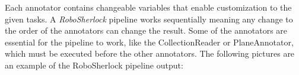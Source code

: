 \documentclass[main.tex]{subfiles}
\begin{document}
Each annotator contains changeable variables that enable customization to the given tasks.
A \textit{RoboSherlock} pipeline works sequentially meaning any change to the order of the annotators can change the result. Some of the annotators are essential for the pipeline to work, like the CollectionReader or PlaneAnnotator, which must be executed before the other annotators. 
The following pictures are an example of the RoboSherlock pipeline output:  \\

\begin{figure}[H]
     \begin{center}
%
        \\ %
\end{center}
\end{figure}
\end{document}
